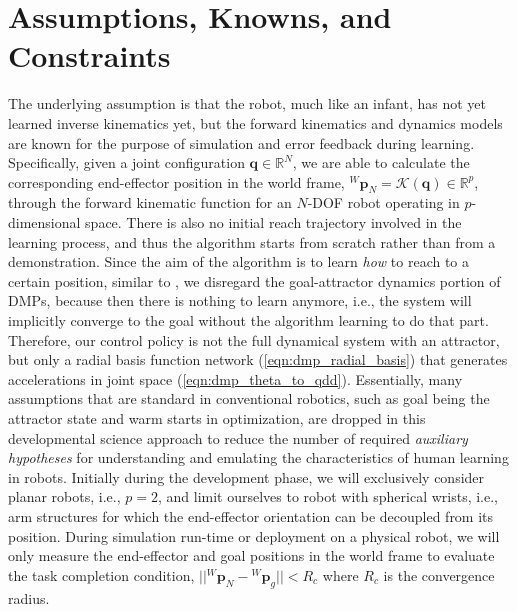 \documentclass[10pt]{article}
\begin{document}
\section{Assumptions, Knowns, and Constraints}
The underlying assumption is that the robot, much like an infant, has not yet learned inverse kinematics yet, but the forward kinematics and dynamics models are known for the purpose of simulation and error feedback during learning. Specifically, given a joint configuration $\mathbf{q} \in \mathbb{R}^N$, we are able to calculate the corresponding end-effector position in the world frame, ${^W}\mathbf{p}_{N} = \mathcal{K}(\mathbf{q}) \in \mathbb{R}^p$, through the forward kinematic function for an $N$-DOF robot operating in $p$-dimensional space. There is also no initial reach trajectory involved in the learning process, and thus the algorithm starts from scratch rather than from a demonstration. Since the aim of the algorithm is to learn \emph{how} to reach to a certain position, similar to \cite{pdff}, we disregard the goal-attractor dynamics portion of DMPs, because then there is nothing to learn anymore, i.e., the system will implicitly converge to the goal without the algorithm learning to do that part. Therefore, our control policy is not the full dynamical system with an attractor, but only a radial basis function network (\ref{eqn:dmp_radial_basis}) that generates accelerations in joint space (\ref{eqn:dmp_theta_to_qdd}). Essentially, many assumptions that are standard in conventional robotics, such as goal being the attractor state and warm starts in optimization, are dropped in this developmental science approach to reduce the number of required \emph{auxiliary hypotheses} for understanding and emulating the characteristics of human learning in robots. Initially during the development phase, we will exclusively consider planar robots, i.e., $p=2$, and limit ourselves to robot with spherical wrists, i.e., arm structures for which the end-effector orientation can be decoupled from its position. During simulation run-time or deployment on a physical robot, we will only measure the end-effector and goal positions in the world frame to evaluate the task completion condition, $||{^W\mathbf{p}_{N}} - {^W}\mathbf{p}_{g}|| < R_c$ where $R_c$ is the convergence radius.
\end{document}
